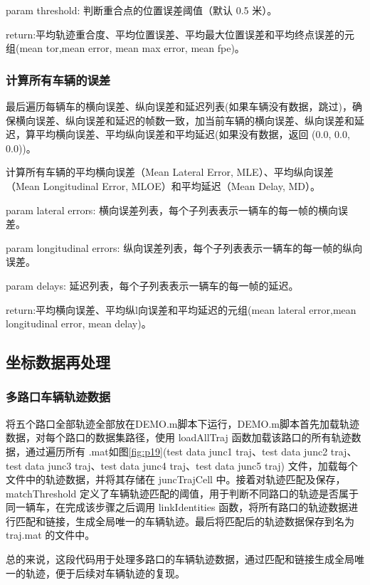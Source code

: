param threshold: 判断重合点的位置误差阈值（默认 0.5 米）。

return:平均轨迹重合度、平均位置误差、平均最大位置误差和平均终点误差的元组(mean tor,mean error, mean max error, mean fpe)。


\subsubsection{计算所有车辆的误差}
最后遍历每辆车的横向误差、纵向误差和延迟列表(如果车辆没有数据，跳过)，确保横向误差、纵向误差和延迟的帧数一致，加当前车辆的横向误差、纵向误差和延迟，算平均横向误差、平均纵向误差和平均延迟(如果没有数据，返回 (0.0, 0.0, 0.0))。

计算所有车辆的平均横向误差（Mean Lateral Error, MLE）、平均纵向误差（Mean Longitudinal Error, MLOE）和平均延迟（Mean Delay, MD）。

param lateral errors: 横向误差列表，每个子列表表示一辆车的每一帧的横向误差。

param longitudinal errors: 纵向误差列表，每个子列表表示一辆车的每一帧的纵向误差。

param delays: 延迟列表，每个子列表表示一辆车的每一帧的延迟。

return:平均横向误差、平均纵l向误差和平均延迟的元组(mean lateral error,mean longitudinal error, mean delay)。


\subsection{坐标数据再处理}
\subsubsection{多路口车辆轨迹数据}

将五个路口全部轨迹全部放在DEMO.m脚本下运行，DEMO.m脚本首先加载轨迹数据，对每个路口的数据集路径，使用 loadAllTraj 函数加载该路口的所有轨迹数据，通过遍历所有 .mat如图\ref{fig:p19}(test data junc1 traj、test data junc2 traj、test data junc3 traj、test data junc4 traj、test data junc5 traj) 文件，加载每个文件中的轨迹数据，并将其存储在 juncTrajCell 中。接着对轨迹匹配及保存，matchThreshold 定义了车辆轨迹匹配的阈值，用于判断不同路口的轨迹是否属于同一辆车，在完成该步骤之后调用 linkIdentities 函数，将所有路口的轨迹数据进行匹配和链接，生成全局唯一的车辆轨迹。最后将匹配后的轨迹数据保存到名为 traj.mat 的文件中。

总的来说，这段代码用于处理多路口的车辆轨迹数据，通过匹配和链接生成全局唯一的轨迹，便于后续对车辆轨迹的复现。



